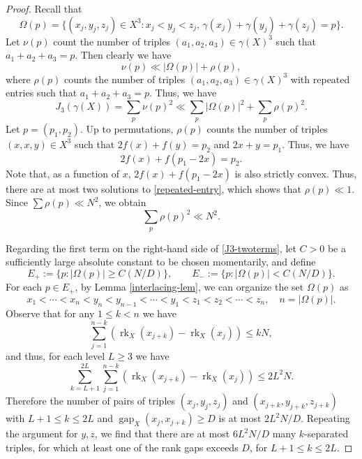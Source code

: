 \documentclass{amsart}
\numberwithin{equation}{section}
\begin{document}
\begin{proof}
    Recall that 
    \begin{equation}
        \nonumber
        \Omega(p)=\{(x_j,y_j,z_j)\in X^3:x_j<y_j<z_j,\, \gamma(x_j)+\gamma(y_j)+\gamma(z_j)=p\}.
    \end{equation}
    Let $\nu(p)$ count the number of triples $(a_1, a_2, a_3)\in\gamma(X)^3$ such that $a_1+a_2+a_3=p$.
    Then clearly we have
    \begin{equation}
    \nonumber
        \nu(p)\ll|\Omega(p)|+\rho(p),
    \end{equation}
    where $\rho(p)$ counts the number of triples $(a_1, a_2, a_3)\in\gamma(X)^3$ with repeated entries such that $a_1+a_2+a_3=p$.
    Thus, we have
    \begin{equation}
        \label{J3-twoterms}
        J_3(\gamma(X))=\sum_p\nu(p)^2\ll\sum_p|\Omega(p)|^2+\sum_p\rho(p)^2.
    \end{equation}
    Let $p=(p_1,p_2)$.
    Up to permutations, $\rho(p)$ counts the number of triples $(x,x,y)\in X^3$ such that $2f(x)+f(y)=p_2$ and $2x+y=p_1$.
    Thus, we have
    \begin{equation}
        \label{repeated-entry}
        2f(x)+f(p_1-2x)=p_2.
    \end{equation}
    Note that, as a function of $x$, $2f(x)+f(p_1-2x)$ is also strictly convex.
    Thus, there are at most two solutions to \eqref{repeated-entry}, which shows that $\rho(p)\ll1$.
    Since $\sum\rho(p)\ll N^2$, we obtain
    \begin{equation}
        \label{repeated-estimate}
        \sum_p\rho(p)^2\ll N^2.
    \end{equation}
    
    \medskip 
    
    Regarding the first term on the right-hand side of \eqref{J3-twoterms}, let \(C > 0\) be a sufficiently large  absolute constant to be chosen momentarily, and define 
    \begin{equation}
        \nonumber
        E_+:=\{p: |\Omega(p)|\geq C(N/D)\}, \qquad E_-:=\{p: |\Omega(p)|< C(N/D)\}.
    \end{equation}
    For each $p\in E_+$, by Lemma \ref{interlacing-lem}, we can organize the set $\Omega(p)$ as
    \[
    x_1<\cdots <x_n<y_n<y_{n-1}<\cdots<y_1<z_1<z_2<\cdots<z_n,\quad n=|\Omega(p)|.
    \]
    Observe that for any \(1 \leq k < n \) we have
    \[
    \sum _{j = 1}^{n - k} \left( \operatorname{rk}_X(x_{j+k})
    - \operatorname{rk}_X(x_j) \right) \leq k N
    ,\]
    and thus,  for each level \(L \geq 3\) we have
    \[
        \sum _{k = L+1} ^{2L} \sum _{j = 1}^{n - k} \left( \operatorname{rk}_X(x_{j+k})- \operatorname{rk}_X(x_j) \right) \leq 2 L^2 N
    .\]
    Therefore the number of pairs of triples \((x_j,y_j,z_j)\) and \((x_{j+k},y_{j+k},z_{j+k})\) with \(L+1 \leq k \leq 2L \) and  \( \operatorname{gap}_X(x_j,x_{j+k}) \geq D\) is at most \(2 L^2 N / D\). Repeating the argument for \(y,z\), we find that there are at most \(6 L^2 N / D\) many \(k\)-separated triples, for which at least one of the rank gaps exceeds \(D\), for \(L+1 \leq k \leq 2L\). 
    

\end{proof}
\end{document}
